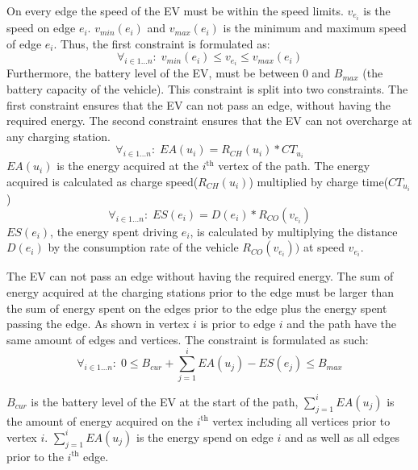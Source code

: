 On every edge the speed of the EV must be within the speed limits. $v_{e_i}$ is the speed on edge $e_i$. $v_{min}(e_i)$ and $v_{max}(e_i)$ is the minimum and maximum speed of edge $e_i$. Thus, the first constraint is formulated as:
\begin{equation*}
\forall_{i\in1 \dots n }:\;v_{min}(e_i) \leq v_{e_i} \leq v_{max}(e_i)
\end{equation*}
Furthermore, the battery level of the EV, must be between $0$ and $B_{max}$ (the battery capacity of the vehicle).
This constraint is split into two constraints. The first constraint ensures that the EV can not pass an edge, without having the required energy. The second constraint ensures that the EV can not overcharge at any charging station.
\begin{equation*}
\forall_{i\in1 \dots n }:\; EA(u_i) = R_{CH}(u_i) * CT_{u_i}
\end{equation*}
$EA(u_i)$ is the energy acquired at the $i^{\text{th}}$ vertex of the path. The energy acquired is calculated as charge speed($R_{CH}(u_i)$) multiplied by charge time($CT_{u_i}$)
\begin{equation*}
\forall_{i\in1 \dots n }:\; ES(e_i) = D(e_i)*R_{CO}(v_{e_i})
\end{equation*}
$ES(e_i)$, the energy spent driving $e_i$, is calculated by multiplying the distance $D(e_i)$ by the consumption rate of the vehicle $R_{CO}(v_{e_i}))$ at speed $v_{e_i}$.

The EV can not pass an edge without having the required energy. The sum of energy acquired at the charging stations prior to the edge must be larger than the sum of energy spent on the edges prior to the edge plus the energy spent passing the edge. As shown in  vertex $i$ is prior to edge $i$ and the path have the same amount of edges and vertices.
The constraint is formulated as such:
\begin{equation*}
\forall_{i\in1 \dots n }:\;0 \leq B_{cur} + \sum_{j=1}^{i} EA(u_j) - ES(e_j) \leq B_{max}
\end{equation*}\label{eq:energyreq}

$B_{cur}$ is the battery level of the EV at the start of the path, $ \sum_{j=1}^{i} EA(u_j)$ is the amount of energy acquired on the $i^{\text{th}}$ vertex including all vertices prior to vertex $i$. $\sum_{j=1}^{i} EA(u_j)$ is the energy spend on edge $i$ and as well as all edges prior to the $i^{\text{th}}$ edge.

